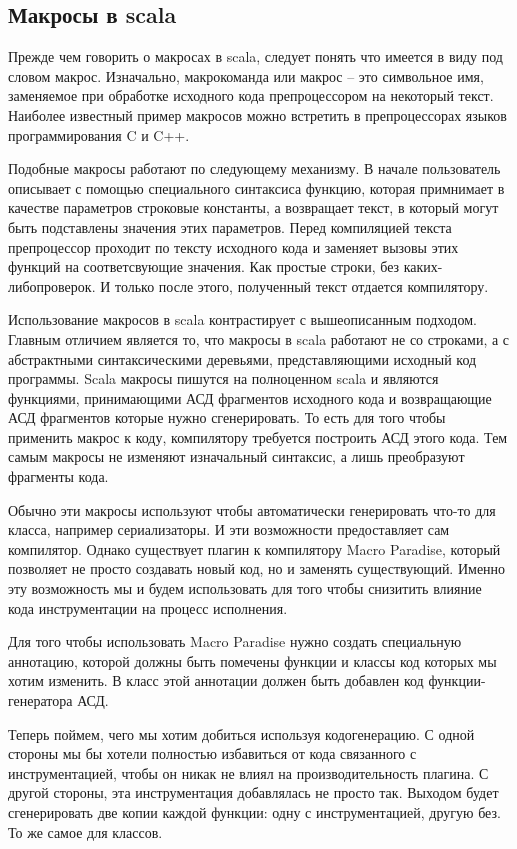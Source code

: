 \subsection{Макросы в scala}
\label{sec:macroScala}

Прежде чем говорить о макросах в scala, следует понять что имеется в виду под словом макрос.
Изначально, макрокоманда или макрос -- это символьное имя,
заменяемое при обработке исходного кода препроцессором на некоторый текст.
Наиболее известный пример макросов можно встретить в препроцессорах языков
программирования C и C++.

Подобные макросы работают по следующему механизму.
В начале пользователь описывает с помощью специального синтаксиса функцию,
которая примнимает в качестве параметров строковые константы, а возвращает текст,
в который могут быть подставлены значения этих параметров.
Перед компиляцией текста препроцессор проходит по тексту исходного кода и заменяет
вызовы этих функций на соответсвующие значения.
Как простые строки, без каких-либопроверок.
И только после этого, полученный текст отдается компилятору.

Использование макросов в scala контрастирует с вышеописанным подходом.
Главным отличием является то, что макросы в scala работают не со строками,
а с абстрактными синтаксическими деревьями, представляющими исходный код
программы.
Scala макросы пишутся на полноценном scala и являются функциями, принимающими
АСД фрагментов исходного кода и возвращающие АСД фрагментов которые нужно
сгенерировать.
То есть для того чтобы применить макрос к коду, компилятору требуется построить
АСД этого кода. Тем самым макросы не изменяют изначальный синтаксис, а лишь
преобразуют фрагменты кода.

Обычно эти макросы используют чтобы автоматически генерировать что-то для класса,
например сериализаторы.
И эти возможности предоставляет сам компилятор.
Однако существует плагин к компилятору Macro Paradise, который позволяет не
просто создавать новый код, но и заменять существующий.
Именно эту возможность мы и будем использовать для того чтобы снизитить влияние
кода инструментации на процесс исполнения.

Для того чтобы использовать Macro Paradise нужно создать специальную аннотацию,
которой должны быть помечены функции и классы код которых мы хотим изменить.
В класс этой аннотации должен быть добавлен код функции-генератора АСД.

Теперь поймем, чего мы хотим добиться используя кодогенерацию.
С одной стороны мы бы хотели полностью избавиться от кода связанного с инструментацией,
чтобы он никак не влиял на производительность плагина.
С другой стороны, эта инструментация добавлялась не просто так.
Выходом будет сгенерировать две копии каждой функции: одну с инструментацией,
другую без.
То же самое для классов.

